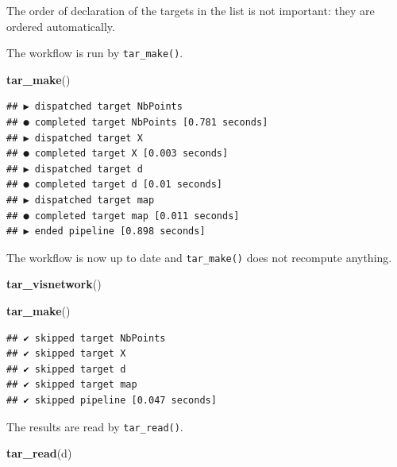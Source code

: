 \documentclass[
  12pt,
  american,
  a4paper,
  extrafontsizes,onecolumn,openright
  ]{memoir}
\newenvironment{Shaded}{\begin{snugshade}}{\end{snugshade}}
\newcommand{\FunctionTok}[1]{\textcolor[rgb]{0.13,0.29,0.53}{\textbf{#1}}}
\newcommand{\NormalTok}[1]{#1}
\begin{document}
\normalsize

The order of declaration of the targets in the list is not important: they are ordered automatically.

The workflow is run by \texttt{tar\_make()}.

\scriptsize

\begin{Shaded}
\begin{Highlighting}[]
\FunctionTok{tar\_make}\NormalTok{()}
\end{Highlighting}
\end{Shaded}

\begin{verbatim}
## ▶ dispatched target NbPoints
## ● completed target NbPoints [0.781 seconds]
## ▶ dispatched target X
## ● completed target X [0.003 seconds]
## ▶ dispatched target d
## ● completed target d [0.01 seconds]
## ▶ dispatched target map
## ● completed target map [0.011 seconds]
## ▶ ended pipeline [0.898 seconds]
\end{verbatim}

\normalsize

The workflow is now up to date and \texttt{tar\_make()} does not recompute anything.

\scriptsize

\begin{Shaded}
\begin{Highlighting}[]
\FunctionTok{tar\_visnetwork}\NormalTok{()}
\end{Highlighting}
\end{Shaded}

\begin{Shaded}
\begin{Highlighting}[]
\FunctionTok{tar\_make}\NormalTok{()}
\end{Highlighting}
\end{Shaded}

\begin{verbatim}
## ✔ skipped target NbPoints
## ✔ skipped target X
## ✔ skipped target d
## ✔ skipped target map
## ✔ skipped pipeline [0.047 seconds]
\end{verbatim}

\normalsize

The results are read by \texttt{tar\_read()}.

\scriptsize

\begin{Shaded}
\begin{Highlighting}[]
\FunctionTok{tar\_read}\NormalTok{(d)}
\end{Highlighting}
\end{Shaded}
\end{document}
